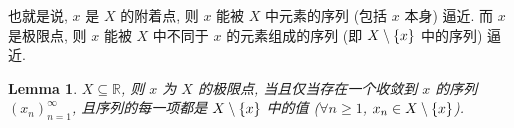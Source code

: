 \documentclass[UTF8]{ctexart}
\theoremstyle{mystyle}
\newtheorem{lemma}{Lemma}[section]
\theoremstyle{myremark}
\theoremstyle{plain}
\newcommand{\R}{\mathbb R}
\DeclarePairedDelimiter\set{\{}{\}}
\begin{document}
也就是说, $ x $ 是 $ X $ 的附着点, 则 $ x $ 能被 $ X $ 中元素的序列 (包括 $ x $ 本身) 逼近. 而 $ x $ 是极限点, 则 $ x $ 能被 $ X $ 中不同于 $ x $ 的元素组成的序列 (即 $ X \setminus \set{x} $ 中的序列) 逼近. 

\begin{lemma}
    $ X \subseteq \R $, 则 $ x $ 为 $ X $ 的极限点, 当且仅当存在一个收敛到 $ x $ 的序列 $ (x_n)_{n = 1}^\infty $, 且序列的每一项都是 $ X \setminus \set{x} $ 中的值 ($ \forall n \geqslant 1 $, $ x_n \in X \setminus \set{x} $).
\end{lemma}
\end{document}
